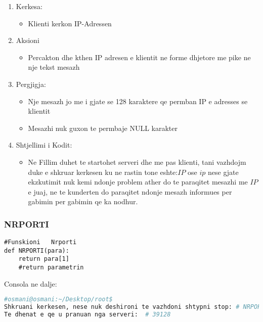 \documentclass[]{article}
\begin{document}
\begin{enumerate}
\item Kerkesa:
\begin{itemize}
\item Klienti kerkon IP-Adressen
\end{itemize}
\item Aksioni
\begin{itemize}
\item Percakton dhe kthen IP adresen e klientit ne forme dhjetore
me pike ne nje tekst mesazh
\end{itemize}
\item Pergjigja:
\begin{itemize}
\item Nje mesazh jo me i gjate se 128 karaktere qe permban IP e adresses se klientit
\item Mesazhi nuk guxon te permbaje NULL karakter

\end{itemize}
\item Shtjellimi i Kodit:
\begin{itemize}
\item Ne Fillim duhet te startohet serveri dhe me pas klienti, tani vazhdojm  duke e shkruar kerkesen ku ne rastin tone eshte:$IP$ ose $ip$ nese gjate ekzkutimit nuk kemi ndonje problem ather do te paraqitet mesazhi me $IP$ e juaj, ne te kunderten do paraqitet ndonje mesazh informues per gabimin per gabimin qe ka nodhur.
\end{itemize}
\end{enumerate}
\newpage

\subsubsection{NRPORTI}


\begin{lstlisting}
#Funskioni   Nrporti
def NRPORTI(para):
    return para[1]
    #return parametrin
\end{lstlisting}
\vspace*{1cm}
\noindent Consola ne dalje:
\begin{lstlisting}[language=bash]
#osmani@osmani:~/Desktop/root$
Shkruani kerkesen, nese nuk deshironi te vazhdoni shtypni stop: # NRPORTI
Te dhenat e qe u pranuan nga serveri:  # 39128

\end{lstlisting}
\end{document}
